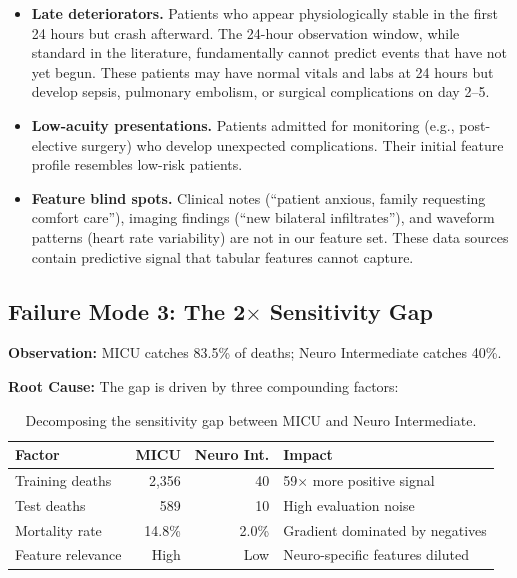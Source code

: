 \documentclass[11pt,a4paper]{report}
\begin{document}
\begin{itemize}[leftmargin=2em]
\item \textbf{Late deteriorators.} Patients who appear physiologically stable in the first 24 hours but crash afterward. The 24-hour observation window, while standard in the literature, fundamentally cannot predict events that have not yet begun. These patients may have normal vitals and labs at 24 hours but develop sepsis, pulmonary embolism, or surgical complications on day 2--5.
\item \textbf{Low-acuity presentations.} Patients admitted for monitoring (e.g., post-elective surgery) who develop unexpected complications. Their initial feature profile resembles low-risk patients.
\item \textbf{Feature blind spots.} Clinical notes (``patient anxious, family requesting comfort care''), imaging findings (``new bilateral infiltrates''), and waveform patterns (heart rate variability) are not in our feature set. These data sources contain predictive signal that tabular features cannot capture.
\end{itemize}

\subsection{Failure Mode 3: The 2$\times$ Sensitivity Gap}

\textbf{Observation:} MICU catches 83.5\% of deaths; Neuro Intermediate catches 40\%.

\textbf{Root Cause:} The gap is driven by three compounding factors:

\begin{table}[H]
\centering
\caption{Decomposing the sensitivity gap between MICU and Neuro Intermediate.}
\label{tab:sens_gap}
\begin{tabular}{lrrl}
\toprule
\textbf{Factor} & \textbf{MICU} & \textbf{Neuro Int.} & \textbf{Impact} \\
\midrule
Training deaths & 2,356 & 40 & 59$\times$ more positive signal \\
Test deaths & 589 & 10 & High evaluation noise \\
Mortality rate & 14.8\% & 2.0\% & Gradient dominated by negatives \\
Feature relevance & High & Low & Neuro-specific features diluted \\
\bottomrule
\end{tabular}
\end{table}
\end{document}
